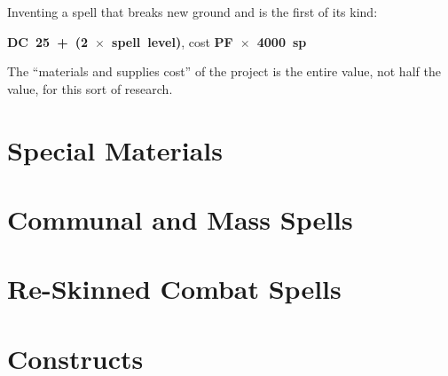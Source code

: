 Inventing a spell that breaks new ground and is the first of its kind:

\mbox{\bfseries DC 25 + (2 $\times$ spell level)}, cost
\mbox{\bfseries PF $\times$ 4000 sp}

The ``materials and supplies cost'' of the project is the entire value, not
half the value, for this sort of research.
%

%
\section{Special Materials}

%

%
\section{Communal and Mass Spells}

%

%
\section{Re-Skinned Combat Spells}

%

%
\section{Constructs}


%
